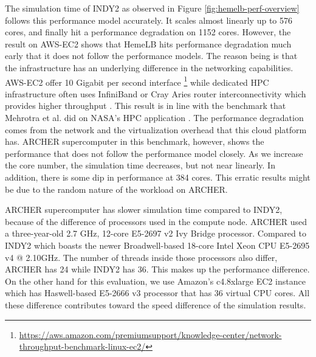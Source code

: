 The simulation time of INDY2 as observed in Figure \ref{fig:hemelb-perf-overview} follows this performance model accurately. It scales almost linearly up to 576 cores, and finally hit a performance degradation on 1152 cores. However, the result on AWS-EC2 shows that HemeLB hits performance degradation much early that it does not follow the performance models. The reason being is that the infrastructure has an underlying difference in the networking capabilities. AWS-EC2 offer 10 Gigabit per second interface \footnote{\url{https://aws.amazon.com/premiumsupport/knowledge-center/network-throughput-benchmark-linux-ec2/}} while dedicated HPC infrastructure often uses InfiniBand or Cray Aries router interconnectivity which provides higher throughput \cite{Quan:2014aa}. This result is in line with the benchmark that Mehrotra et al. did on NASA's HPC application \citep{mehrotra2012performance}. The performance degradation comes from the network and the virtualization overhead that this cloud platform has.  ARCHER supercomputer in this benchmark, however, shows the performance that does not follow the performance model closely. As we increase the core number, the simulation time decreases, but not near linearly. In addition, there is some dip in performance at 384 cores. This erratic results might be due to the random nature of the workload on ARCHER. 


ARCHER supercomputer has slower simulation time compared to INDY2, because of the difference of processors used in the compute node. ARCHER used a three-year-old 2.7 GHz, 12-core E5-2697 v2 Ivy Bridge processor. Compared to INDY2 which boasts the newer Broadwell-based 18-core Intel Xeon CPU E5-2695 v4 @ 2.10GHz. The number of threads inside those processors also differ, ARCHER has 24 while INDY2 has 36. This makes up the performance difference. On the other hand for this evaluation, we use Amazon's c4.8xlarge EC2 instance which has Haswell-based E5-2666 v3 processor that has 36 virtual CPU cores. All these difference contributes toward the speed difference of the simulation results.

